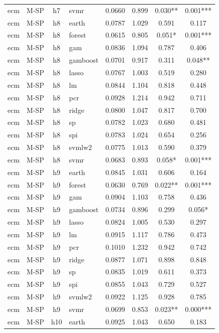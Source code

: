 \begin{ThreePartTable}
\begin{longtable}[t]{llclcccc}
ecm & M-SP & h7 & svmr & 0.0660 & 0.899 & 0.030** & 0.001***\\
\addlinespace
ecm & M-SP & h8 & earth & 0.0787 & 1.029 & 0.591 & 0.117\\
ecm & M-SP & h8 & forest & 0.0615 & 0.805 & 0.051* & 0.001***\\
ecm & M-SP & h8 & gam & 0.0836 & 1.094 & 0.787 & 0.406\\
ecm & M-SP & h8 & gamboost & 0.0701 & 0.917 & 0.311 & 0.048**\\
ecm & M-SP & h8 & lasso & 0.0767 & 1.003 & 0.519 & 0.280\\
ecm & M-SP & h8 & lm & 0.0844 & 1.104 & 0.818 & 0.448\\
ecm & M-SP & h8 & pcr & 0.0928 & 1.214 & 0.942 & 0.711\\
ecm & M-SP & h8 & ridge & 0.0800 & 1.047 & 0.817 & 0.700\\
ecm & M-SP & h8 & sp & 0.0782 & 1.023 & 0.680 & 0.481\\
ecm & M-SP & h8 & spi & 0.0783 & 1.024 & 0.654 & 0.256\\
ecm & M-SP & h8 & svmlw2 & 0.0775 & 1.013 & 0.590 & 0.379\\
ecm & M-SP & h8 & svmr & 0.0683 & 0.893 & 0.058* & 0.001***\\
\addlinespace
ecm & M-SP & h9 & earth & 0.0845 & 1.031 & 0.606 & 0.164\\
ecm & M-SP & h9 & forest & 0.0630 & 0.769 & 0.022** & 0.001***\\
ecm & M-SP & h9 & gam & 0.0904 & 1.103 & 0.758 & 0.436\\
ecm & M-SP & h9 & gamboost & 0.0734 & 0.896 & 0.299 & 0.056*\\
ecm & M-SP & h9 & lasso & 0.0824 & 1.005 & 0.530 & 0.297\\
ecm & M-SP & h9 & lm & 0.0915 & 1.117 & 0.786 & 0.473\\
ecm & M-SP & h9 & pcr & 0.1010 & 1.232 & 0.942 & 0.742\\
ecm & M-SP & h9 & ridge & 0.0877 & 1.071 & 0.898 & 0.848\\
ecm & M-SP & h9 & sp & 0.0835 & 1.019 & 0.611 & 0.373\\
ecm & M-SP & h9 & spi & 0.0855 & 1.043 & 0.729 & 0.527\\
ecm & M-SP & h9 & svmlw2 & 0.0922 & 1.125 & 0.928 & 0.785\\
ecm & M-SP & h9 & svmr & 0.0699 & 0.853 & 0.023** & 0.000***\\
\addlinespace
ecm & M-SP & h10 & earth & 0.0925 & 1.043 & 0.650 & 0.183\\

\end{longtable}
\end{ThreePartTable}
